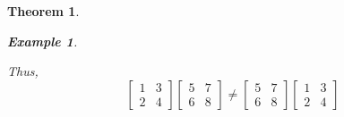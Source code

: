 \documentclass[12pt, a4paper]{article}
\newtheorem{thm}{Theorem}[subsection]
\newtheorem{eg}{Example}[subsection]
\begin{document}
\begin{thm}
\begin{enumerate}
\begin{enumerate}
\begin{eg}
\begin{itemize}
			Thus, \[\begin{bmatrix}1&3\\2&4\end{bmatrix}\begin{bmatrix}5&7\\6&8\end{bmatrix}\neq\begin{bmatrix}5&7\\6&8\end{bmatrix}\begin{bmatrix}1&3\\2&4\end{bmatrix}\]
		\end{itemize}
		\end{eg}
	\end{enumerate}
\end{enumerate}	
\end{thm}
\end{document}
